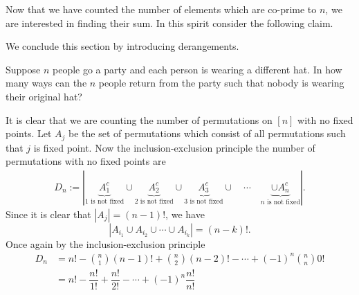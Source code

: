 Now that we have counted the number of elements which are co-prime to $n$, we are interested in finding their sum. In this spirit consider the following claim.
\begin{claim}
\end{claim}
We conclude this section by introducing derangements. 
\begin{question}
Suppose $n$ people go a party and each person is wearing a different hat. In how many ways can the $n$ people return from the party such that nobody is wearing their original hat?    
\end{question}
\begin{solution}
It is clear that we are counting the number of permutations on $[n]$ with no fixed points. Let $A_j$ be the set of permutations which consist of all permutations such that $j$ is fixed point. Now the inclusion-exclusion principle the number of permutations with no fixed points are
\begin{align*}
D_n:=|\underbrace{A_1^c}_{1 \text{ is not fixed}} \cup \underbrace{A_2^c}_{2 \text{ is not fixed}} \cup \underbrace{A_3^c}_{3 \text{ is not fixed}} \cup \quad \cdots \quad \underbrace{\cup A_n^c}_{n \text{ is not fixed}}|.
\end{align*}
Since it is clear that $|A_j|=(n-1)!$, we have
\[
|A_{i_1}\cup A_{i_2}\cup \cdots \cup A_{i_k}| = (n-k)!.
\]
Once again by the inclusion-exclusion principle
\begin{align*}
    D_n &= n! - \binom{n}{1}(n-1)! + \binom{n}{2}(n-2)! -  \cdots + (-1)^n\binom{n}{n}0! \\
    &= n! - \dfrac{n!}{1!} + \dfrac{n!}{2!} - \cdots + (-1)^n\dfrac{n!}{n!}
\end{align*}
\end{solution}

